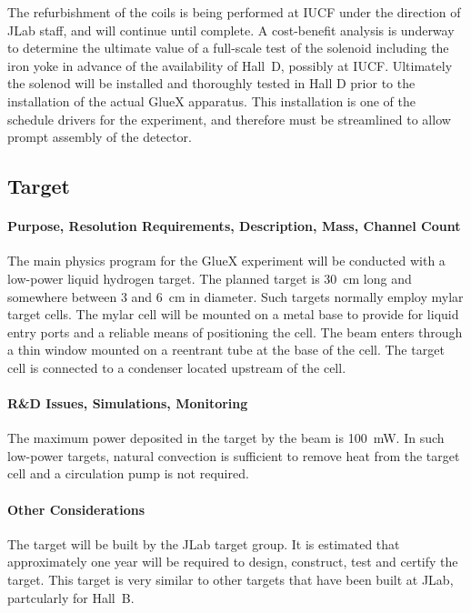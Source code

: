 \documentclass[11pt]{article}
\begin{document}
The refurbishment of the coils is being performed at IUCF under
the direction of JLab staff, and will continue until complete.
A cost-benefit analysis is underway to determine the ultimate value 
of a full-scale test of the solenoid including the iron yoke 
in advance of the availability of Hall~D, possibly at IUCF.
Ultimately the solenod will be installed and thoroughly tested in Hall D 
prior to the installation of the actual GlueX apparatus. This installation
is one of the schedule drivers for the experiment, and therefore must be 
streamlined to allow prompt assembly of the detector.

\subsection{Target}

\paragraph{Purpose, Resolution Requirements, Description, Mass, Channel Count}
The main physics program for the GlueX experiment will be conducted with a
low-power liquid hydrogen target. The planned target is 30~cm long and
somewhere between 3 and 6~cm in diameter. Such targets normally 
employ mylar target cells. The mylar cell will be mounted on a metal base 
to provide for liquid entry ports and a reliable means of positioning the 
cell. The beam enters through a thin window mounted on a reentrant tube at 
the base of the cell. The target cell is connected to a condenser located 
upstream of the cell.

\paragraph{R\&D Issues, Simulations, Monitoring}
The maximum power deposited in the target by the beam is 100~mW.  In such low-power
targets, natural convection is sufficient to remove heat from the target cell and a
circulation pump is not required.

\paragraph{Other Considerations}

The target will be built by the JLab target group. It is estimated that
approximately one year will be required to design, construct, test and
certify the target. This target is very similar to other targets that
have been built at JLab, partcularly for Hall~B.
\end{document}
